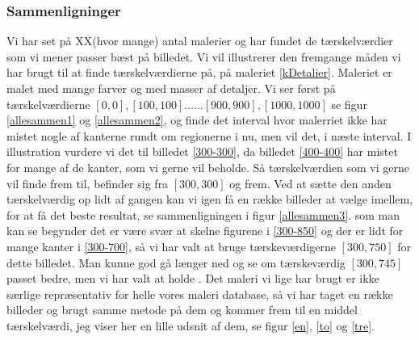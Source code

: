 \subsubsection{Sammenligninger}
Vi har set på XX(hvor mange) antal malerier og har fundet de
tærskelværdier som vi mener passer bæst på billedet. Vi vil illustrerer
den fremgange måden vi har brugt til at finde tærskelværdierne på, på
maleriet \ref{kDetalier}. Maleriet er malet med mange farver og med
masser af detaljer. Vi ser først på tærskelværdierne
$[0,0],[100,100]......[900,900],[1000,1000]$ se figur \ref{allesammen1}
og \ref{allesammen2}, og finde det interval hvor malerriet ikke har
mistet nogle af kanterne rundt om regionerne i nu, men vil det, i næste
interval. I illustration vurdere vi det til billedet \ref{300-300}, da
billedet \ref{400-400} har mistet for mange af de kanter, som vi gerne
vil beholde. Så tærskelværdien som vi gerne vil finde frem til, befinder
sig fra $[300,300]$ og frem. Ved at sætte den anden tærskelværdig op
lidt af gangen kan vi igen få en række billeder at vælge imellem, for at
få det beste resultat, se sammenligningen i figur \ref{allesammen3}. som
man kan se begynder det er være svær at skelne figurene i \ref{300-850}
og der er lidt for mange kanter i \ref{300-700}, så vi har valt at bruge
tærskeværdigerne $[300,750]$ for dette billedet. Man kunne god gå længer
ned og se om tærskeværdig $[300,745]$ passet bedre, men vi har valt at
holde . Det maleri vi lige har brugt er ikke særlige repræsentativ for
helle vores maleri database, så vi har taget en række billeder og brugt
samme metode på dem og kommer frem til en middel tærskelværdi, jeg viser
her en lille udsnit af dem, se figur \ref{en}, \ref{to} og \ref{tre}.


